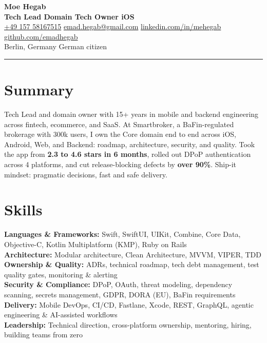 \documentclass[10pt,a4paper]{article}
\begin{document}
\noindent
{\fontsize{20}{24}\selectfont\bfseries\color{darktext} Moe Hegab}\\[3pt]
{\large\bfseries\color{accent} Tech Lead \textperiodcentered{} Domain Tech Owner \textperiodcentered{} iOS}\\[7pt]
{\small\color{muted}%
  \href{tel:+4915758167515}{+49 157 58167515}%
  \quad\textbullet\quad
  \href{mailto:emad.hegab@gmail.com}{emad.hegab@gmail.com}%
  \quad\textbullet\quad
  \href{https://www.linkedin.com/in/mehegab/}{linkedin.com/in/mehegab}%
  \quad\textbullet\quad
  \href{https://github.com/emadhegab}{github.com/emadhegab}%
  \\[2pt]
  Berlin, Germany \quad\textbullet\quad German citizen%
}

\vspace{8pt}
{\color{hdrborder}\rule{\linewidth}{0.8pt}}
\vspace{4pt}

\section{Summary}
{\small\color{bodytext}
Tech Lead and domain owner with 15+ years in mobile and backend engineering across fintech, ecommerce, and SaaS.
At Smartbroker, a BaFin-regulated brokerage with 300k users, I own the Core domain end to end across iOS, Android, Web,
and Backend: roadmap, architecture, security, and quality. Took the app from \textbf{2.3 to 4.6 stars in 6 months},
rolled out DPoP authentication across 4 platforms, and cut release-blocking defects by \textbf{over 90\%}.
Ship-it mindset: pragmatic decisions, fast and safe delivery.
}

\section{Skills}
{\small\color{bodytext}
\textbf{Languages \& Frameworks:} Swift, SwiftUI, UIKit, Combine, Core Data, Objective-C, Kotlin Multiplatform (KMP), Ruby on Rails\\[3pt]
\textbf{Architecture:} Modular architecture, Clean Architecture, MVVM, VIPER, TDD\\[3pt]
\textbf{Ownership \& Quality:} ADRs, technical roadmap, tech debt management, test quality gates, monitoring \& alerting\\[3pt]
\textbf{Security \& Compliance:} DPoP, OAuth, threat modeling, dependency scanning, secrets management, GDPR, DORA (EU), BaFin requirements\\[3pt]
\textbf{Delivery:} Mobile DevOps, CI/CD, Fastlane, Xcode, REST, GraphQL, agentic engineering \& AI-assisted workflows\\[3pt]
\textbf{Leadership:} Technical direction, cross-platform ownership, mentoring, hiring, building teams from zero
}
\end{document}
